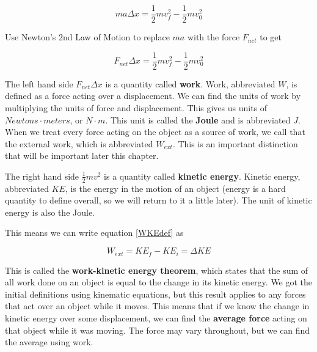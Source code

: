 \documentclass[12pt]{book}
\begin{document}
\begin{equation}
ma \Delta x = \frac{1}{2} m v_f^2 - \frac{1}{2} m v_0^2
\end{equation}

Use Newton's 2nd Law of Motion to replace $ma$ with the force $F_{net}$ to get

\begin{equation}
F_{net} \Delta x = \frac{1}{2} m v_f^2 - \frac{1}{2} m v_0^2
\label{WKEdef}
\end{equation}

The left hand side $F_{net} \Delta x$ is a quantity called \textbf{work}. Work, abbreviated $W$, is defined as a force acting over a displacement. We can find the units of work by multiplying the units of force and displacement. This gives us units of $Newtons \cdot meters$, or $N \cdot m$. This unit is called the \textbf{Joule} and is abbreviated $J$. When we treat every force acting on the object as a source of work, we call that the external work, which is abbreviated $W_{ext}$. This is an important distinction that will be important later this chapter.

The right hand side $\frac{1}{2} m v^2$ is a quantity called \textbf{kinetic energy}. Kinetic energy, abbreviated $KE$, is the energy in the motion of an object (energy is a hard quantity to define overall, so we will return to it a little later). The unit of kinetic energy is also the Joule.

This means we can write equation \ref{WKEdef} as 

\begin{equation}
W_{ext} = KE_f - KE_i = \Delta KE
\label{WKEtheorem}
\end{equation}

This is called the \textbf{work-kinetic energy theorem}, which states that the sum of all work done on an object is equal to the change in its kinetic energy. We got the initial definitions using kinematic equations, but this result applies to any forces that act over an object while it moves. This means that if we know the change in kinetic energy over some displacement, we can find the \textbf{average force} acting on that object while it was moving. The force may vary throughout, but we can find the average using work.
\end{document}
